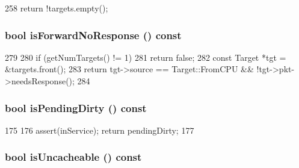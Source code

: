 \begin{DoxyCode}
258 { return !targets.empty(); }
\end{DoxyCode}
\hypertarget{classMSHR_aee2f7196808cfdd31122d93d11b633de}{
\subsubsection[{isForwardNoResponse}]{\setlength{\rightskip}{0pt plus 5cm}bool isForwardNoResponse () const}}
\label{classMSHR_aee2f7196808cfdd31122d93d11b633de}



\begin{DoxyCode}
279     {
280         if (getNumTargets() != 1)
281             return false;
282         const Target *tgt = &targets.front();
283         return tgt->source == Target::FromCPU && !tgt->pkt->needsResponse();
284     }
\end{DoxyCode}
\hypertarget{classMSHR_a46636974002da45a91f2019ff47b5025}{
\subsubsection[{isPendingDirty}]{\setlength{\rightskip}{0pt plus 5cm}bool isPendingDirty () const}}
\label{classMSHR_a46636974002da45a91f2019ff47b5025}



\begin{DoxyCode}
175                                 {
176         assert(inService); return pendingDirty;
177     }
\end{DoxyCode}
\hypertarget{classMSHR_a70c74b2809417ea8701dd6ba9e34312d}{
\subsubsection[{isUncacheable}]{\setlength{\rightskip}{0pt plus 5cm}bool isUncacheable () const}}
\label{classMSHR_a70c74b2809417ea8701dd6ba9e34312d}



